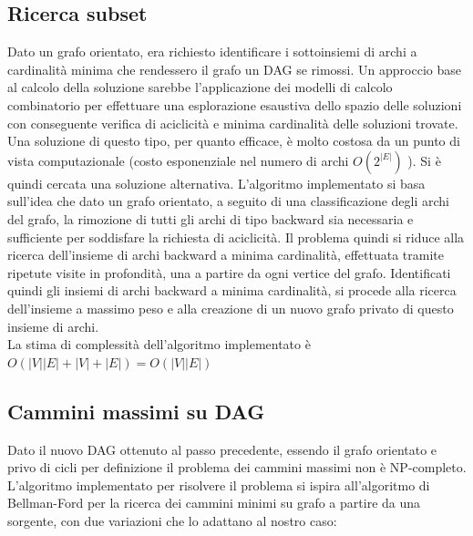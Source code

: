 \documentclass[11pt, a4paper, titlepage]{article}
\begin{document}
            \subsection{Ricerca subset}
                Dato un grafo orientato, era richiesto identificare i sottoinsiemi di archi a cardinalità minima che rendessero il grafo un DAG se rimossi.
                Un approccio base al calcolo della soluzione sarebbe l'applicazione dei modelli di calcolo combinatorio per effettuare una esplorazione esaustiva dello
                spazio delle soluzioni con conseguente verifica di aciclicità e minima cardinalità delle soluzioni trovate. Una soluzione di questo tipo, per quanto efficace,
                è molto costosa da un punto di vista computazionale (costo esponenziale nel numero di archi
                \begin{math}
                    O(2^{|E|})
                \end{math}
                ).
                Si è quindi cercata una soluzione alternativa.
                L'algoritmo implementato si basa sull'idea che dato un grafo orientato, a seguito di una classificazione degli archi del grafo, la rimozione di tutti gli archi di
                tipo backward sia necessaria e sufficiente per soddisfare la richiesta di aciclicità. Il problema quindi si riduce alla ricerca dell'insieme di archi backward a minima cardinalità,
                effettuata tramite ripetute visite in profondità, una a partire da ogni vertice del grafo. Identificati quindi gli insiemi di archi backward a minima cardinalità, si procede alla
                ricerca dell'insieme a massimo peso e alla creazione di un nuovo grafo privato di questo insieme di archi.\\
                La stima di complessità dell'algoritmo implementato è 
                \begin{math}
                    O(|V| |E| + |V|+|E|) = O(|V| |E|)
                \end{math}
                

            \subsection{Cammini massimi su DAG}
                Dato il nuovo DAG ottenuto al passo precedente, essendo il grafo orientato e privo di cicli per definizione il problema dei cammini massimi non è NP-completo.
                L'algoritmo implementato per risolvere il problema si ispira all'algoritmo di Bellman-Ford per la ricerca dei cammini minimi su grafo a partire da una sorgente, con due variazioni
                che lo adattano al nostro caso: 
                
\end{document}
